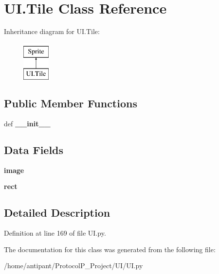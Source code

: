 \hypertarget{classUI_1_1Tile}{\section{U\-I.\-Tile Class Reference}
\label{classUI_1_1Tile}
}
Inheritance diagram for U\-I.\-Tile\-:\begin{figure}[H]
\begin{center}
\leavevmode
\includegraphics[height=2.000000cm]{classUI_1_1Tile}
\end{center}
\end{figure}
\subsection*{Public Member Functions}
\begin{DoxyCompactItemize}
\item 
\hypertarget{classUI_1_1Tile_a1c4f05ed21232b62e032fa41af69b982}{def {\bfseries \-\_\-\-\_\-init\-\_\-\-\_\-}}\label{classUI_1_1Tile_a1c4f05ed21232b62e032fa41af69b982}

\end{DoxyCompactItemize}
\subsection*{Data Fields}
\begin{DoxyCompactItemize}
\item 
\hypertarget{classUI_1_1Tile_a51940c7163d4bc065beeadaf4cac09e1}{{\bfseries image}}\label{classUI_1_1Tile_a51940c7163d4bc065beeadaf4cac09e1}

\item 
\hypertarget{classUI_1_1Tile_a79aeac4554e05d4d7898ea9ef18eff59}{{\bfseries rect}}\label{classUI_1_1Tile_a79aeac4554e05d4d7898ea9ef18eff59}

\end{DoxyCompactItemize}


\subsection{Detailed Description}


Definition at line 169 of file U\-I.\-py.



The documentation for this class was generated from the following file\-:\begin{DoxyCompactItemize}
\item 
/home/antipant/\-Protocol\-P\-\_\-\-Project/\-U\-I/U\-I.\-py\end{DoxyCompactItemize}
